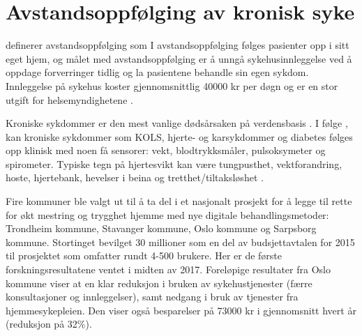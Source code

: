 \section{Avstandsoppfølging av kronisk syke}
\label{sec:remotemonitoring}
\citet{rojahn2016remote} definerer avstandsoppfølging som 
I avstandsoppfølging følges pasienter opp i sitt eget hjem, og
målet med avstandsoppfølging er å unngå sykehusinnleggelse ved å oppdage forverringer tidlig og la
pasientene behandle sin egen sykdom. Innleggelse på sykehus koster gjennomsnittlig 40000 kr per døgn og er en stor utgift
for helsemyndighetene \citep{regjeringen_innleggelse}.

Kroniske sykdommer er den mest vanlige dødsårsaken på verdensbasis \citep{who_chronic}.
I følge \citet{austad2016sensorer}, kan kroniske sykdommer som KOLS, hjerte- og karsykdommer og diabetes
følges opp klinisk med noen få sensorer: vekt, blodtrykksmåler, pulsoksymeter og spirometer. Typiske
tegn på hjertesvikt kan være tungpusthet, vektforandring, hoste, hjertebank, hevelser i beina og
tretthet/tiltaksløshet \citep{ehelse_hjertesvikt} \citep{nasjonalforeningen}.

Fire kommuner ble valgt ut til å ta del i et nasjonalt prosjekt for å legge til rette for økt mestring
og trygghet hjemme med nye digitale behandlingsmetoder: Trondheim kommune, Stavanger kommune, Oslo kommune og Sarpsborg kommune.
Stortinget bevilget 30 millioner som en del av budsjettavtalen for 2015 til prosjektet som omfatter rundt 4-500 brukere. %
Her er de første forskningsresultatene ventet i midten av 2017. Foreløpige resultater fra Oslo kommune viser at
en klar reduksjon i bruken av sykehustjenester (færre konsultasjoner og innleggelser), samt nedgang i bruk av
tjenester fra hjemmesykepleien. Den viser også besparelser på 73000 kr i gjennomsnitt hvert år (reduksjon på 32\%).

